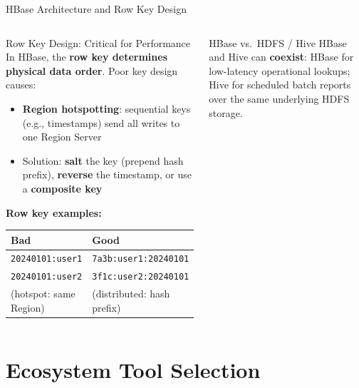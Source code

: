 \documentclass[aspectratio=169,10pt]{beamer}
\begin{document}
\begin{frame}[fragile]{HBase Architecture and Row Key Design}
\begin{columns}[T]
      \begin{alertblock}{Row Key Design: Critical for Performance}
        In HBase, the \textbf{row key determines physical data order}.  Poor key design causes:
        {\small\begin{itemize}
          \item \textbf{Region hotspotting}: sequential keys (e.g., timestamps) send all writes to one Region Server
          \item Solution: \textbf{salt} the key (prepend hash prefix), \textbf{reverse} the timestamp, or use a \textbf{composite key}
        \end{itemize}}
        \vspace{6pt}
        \textbf{Row key examples:}
        \begin{tabular}{ll}
          \toprule
          \textbf{Bad} & \textbf{Good} \\
          \midrule
          \texttt{20240101:user1} & \texttt{7a3b:user1:20240101} \\
          \texttt{20240101:user2} & \texttt{3f1c:user2:20240101} \\
          (hotspot: same Region) & (distributed: hash prefix) \\
          \bottomrule
        \end{tabular}
      \end{alertblock}
      \vspace{4pt}
      \begin{block}{HBase vs.\ HDFS / Hive}
        \small HBase and Hive can \textbf{coexist}: HBase for low-latency operational lookups; Hive for scheduled batch reports over the same underlying HDFS storage.
      \end{block}
  \end{columns}
\end{frame}

\section{Ecosystem Tool Selection}
\end{document}
